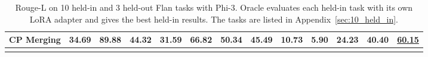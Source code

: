 \begin{table}[h]
\begin{adjustbox}
\begin{tabular}{l|ccccccccccc|c}
\midrule

\textbf{CP Merging} & 34.69 & 89.88 & 44.32 & 31.59 & 66.82 & 50.34 & 45.49 & 10.73 & 5.90 & 24.23 & \cellcolor[HTML]{FDE9E8}\textbf{40.40} & \cellcolor[HTML]{FDE9E8}\underline{60.15} \\

\midrule

\Xhline{1.6pt}
\end{tabular}
\end{adjustbox}
\caption{Rouge-L on 10 held-in and 3 held-out Flan tasks with Phi-3. Oracle evaluates each held-in task with its own LoRA adapter and gives the best held-in results. The tasks are listed in Appendix~\ref{sec:10_held_in}.}
\label{tab:in_domain_full}
\end{table}